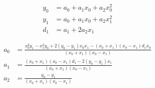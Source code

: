 \begin{align}
  y_0 & = a_0+a_1 x_0+a_2 x_0^{2}  \\
   y_1 & = a_0+a_1 x_0+a_2 x_1^{2}  \\
   d_1 & = a_1+2 a_2 x_1  
\end{align}

 
\begin{align}
   a_0 & = \frac
{x_0^{2} y_1 - x_1^{2} y_0+2 \left(y_0 - y_1\right) x_0 x_1 - \left(x_0+x_1 \right) \left(x_0 - x_1\right) d_1 x_0}
{\left(x_0+x_1\right) \left( x_0 - x_1\right)} \\
   a_1 & = \frac
{\left(x_0+x_1\right) \left(x_0 - x_1\right) d_1 -  2 \left(y_0 - y_1\right) x_1}
{\left(x_0+x_1\right) \left(x_0 - x_1 \right)} \\
   a_2 & = \frac
{y_0 - y_1}
{\left(x_0+x_1\right) \left(x_0  - x_1\right)} 
\end{align}
